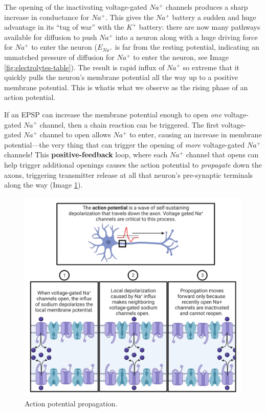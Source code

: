 \documentclass[
]{book}
\begin{document}
The opening of the inactivating voltage-gated \(Na^+\) channels produces a sharp increase in conductance for \(Na^+\). This gives the \(Na^+\) battery a sudden and huge advantage in its ``tug of war'' with the \(K^+\) battery: there are now many pathways available for diffusion to push \(Na^+\) into a neuron along with a huge driving force for \(Na^+\) to enter the neuron (\(E_{Na^+}\) is far from the resting potential, indicating an unmatched pressure of diffusion for \(Na^+\) to enter the neuron, see Image \ref{fig:electrolytes-table}). The result is rapid influx of \(Na^+\) so extreme that it quickly pulls the neuron's membrane potential all the way up to a positive membrane potential. This is whatis what we observe as the rising phase of an action potential.

If an EPSP can increase the membrane potential enough to open \emph{one} voltage-gated \(Na^+\) channel, then a chain reaction can be triggered. The first voltage-gated \(Na^+\) channel to open allows \(Na^+\) to enter, causing an increase in membrane potential---the very thing that can trigger the opening of \emph{more} voltage-gated \(Na^+\) channels! This \textbf{positive-feedback} loop, where each \(Na^+\) channel that opens can help trigger additional openings causes the action potential to \emph{propagate} down the axons, triggering transmitter release at all that neuron's pre-synaptic terminals along the way (Image \ref{fig:action-potential-propagation}).

\begin{figure}

{\centering \includegraphics[width=0.9\linewidth]{images/ch02/02_26} 

}

\caption{Action potential propagation.}\label{fig:action-potential-propagation}
\end{figure}
\end{document}
